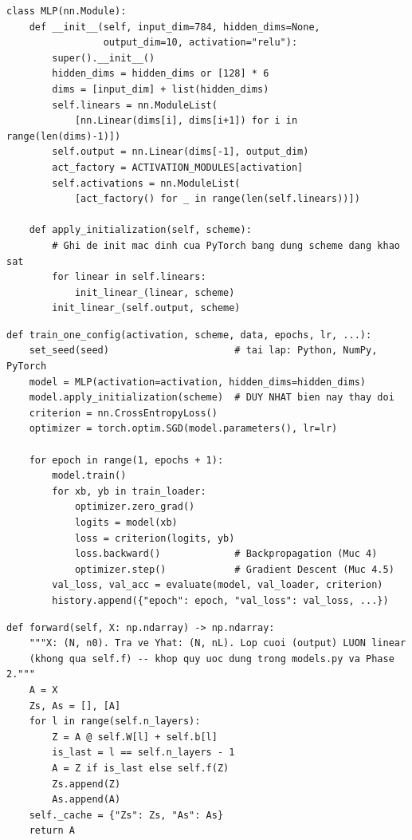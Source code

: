 \documentclass[12pt,a4paper]{article}
\begin{document}
\begin{lstlisting}[caption={Định nghĩa MLP và khởi tạo lại theo scheme (trích từ src/models.py)}]
class MLP(nn.Module):
    def __init__(self, input_dim=784, hidden_dims=None,
                 output_dim=10, activation="relu"):
        super().__init__()
        hidden_dims = hidden_dims or [128] * 6
        dims = [input_dim] + list(hidden_dims)
        self.linears = nn.ModuleList(
            [nn.Linear(dims[i], dims[i+1]) for i in range(len(dims)-1)])
        self.output = nn.Linear(dims[-1], output_dim)
        act_factory = ACTIVATION_MODULES[activation]
        self.activations = nn.ModuleList(
            [act_factory() for _ in range(len(self.linears))])

    def apply_initialization(self, scheme):
        # Ghi de init mac dinh cua PyTorch bang dung scheme dang khao sat
        for linear in self.linears:
            init_linear_(linear, scheme)
        init_linear_(self.output, scheme)
\end{lstlisting}

\begin{lstlisting}[caption={Vòng lặp huấn luyện, rút gọn (trích từ src/training.py)}]
def train_one_config(activation, scheme, data, epochs, lr, ...):
    set_seed(seed)                      # tai lap: Python, NumPy, PyTorch
    model = MLP(activation=activation, hidden_dims=hidden_dims)
    model.apply_initialization(scheme)  # DUY NHAT bien nay thay doi
    criterion = nn.CrossEntropyLoss()
    optimizer = torch.optim.SGD(model.parameters(), lr=lr)

    for epoch in range(1, epochs + 1):
        model.train()
        for xb, yb in train_loader:
            optimizer.zero_grad()
            logits = model(xb)
            loss = criterion(logits, yb)
            loss.backward()             # Backpropagation (Muc 4)
            optimizer.step()            # Gradient Descent (Muc 4.5)
        val_loss, val_acc = evaluate(model, val_loader, criterion)
        history.append({"epoch": epoch, "val_loss": val_loss, ...})
\end{lstlisting}

\begin{lstlisting}[caption={Forward pass -- src/manual\_nn.py}]
def forward(self, X: np.ndarray) -> np.ndarray:
    """X: (N, n0). Tra ve Yhat: (N, nL). Lop cuoi (output) LUON linear
    (khong qua self.f) -- khop quy uoc dung trong models.py va Phase 2."""
    A = X
    Zs, As = [], [A]
    for l in range(self.n_layers):
        Z = A @ self.W[l] + self.b[l]
        is_last = l == self.n_layers - 1
        A = Z if is_last else self.f(Z)
        Zs.append(Z)
        As.append(A)
    self._cache = {"Zs": Zs, "As": As}
    return A
\end{lstlisting}
\end{document}
